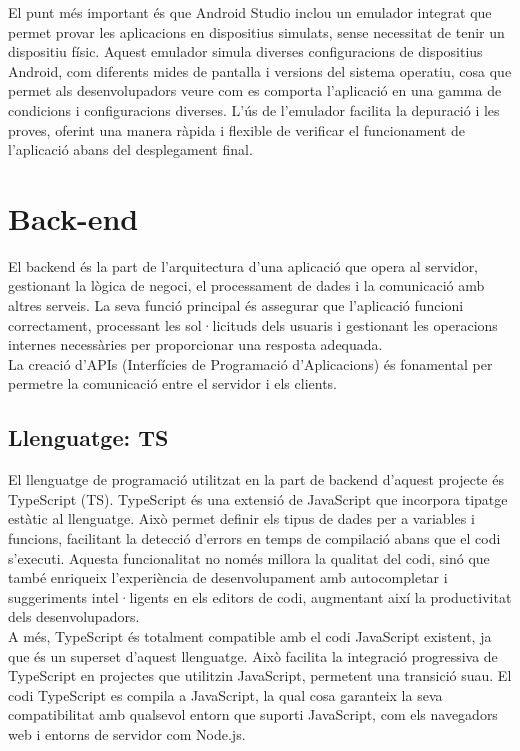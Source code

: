 \documentclass[a4paper,12pt,twoside]{ThesisStyle}
\begin{document}
El punt més important és que Android Studio inclou un emulador integrat que permet provar les aplicacions en dispositius simulats, sense necessitat de tenir un dispositiu físic. Aquest emulador simula diverses configuracions de dispositius Android, com diferents mides de pantalla i versions del sistema operatiu, cosa que permet als desenvolupadors veure com es comporta l’aplicació en una gamma de condicions i configuracions diverses. L'ús de l'emulador facilita la depuració i les proves, oferint una manera ràpida i flexible de verificar el funcionament de l’aplicació abans del desplegament final.



\section{Back-end}
\label{sec: Back-end}

El backend és la part de l'arquitectura d'una aplicació que opera al servidor, gestionant la lògica de negoci, el processament de dades i la comunicació amb altres serveis. La seva funció principal és assegurar que l'aplicació funcioni correctament, processant les sol·licituds dels usuaris i gestionant les operacions internes necessàries per proporcionar una resposta adequada.\\

La creació d'APIs (Interfícies de Programació d'Aplicacions) és fonamental per permetre la comunicació entre el servidor i els clients.

\subsection{Llenguatge: TS}
\label{subsec:Llenguatge: TS}

El llenguatge de programació utilitzat en la part de backend d'aquest projecte és TypeScript (TS). TypeScript és una extensió de JavaScript que incorpora tipatge estàtic al llenguatge. Això permet definir els tipus de dades per a variables i funcions, facilitant la detecció d'errors en temps de compilació abans que el codi s'executi. Aquesta funcionalitat no només millora la qualitat del codi, sinó que també enriqueix l'experiència de desenvolupament amb autocompletar i suggeriments intel·ligents en els editors de codi, augmentant així la productivitat dels desenvolupadors.\\

A més, TypeScript és totalment compatible amb el codi JavaScript existent, ja que és un superset d’aquest llenguatge. Això facilita la integració progressiva de TypeScript en projectes que utilitzin JavaScript, permetent una transició suau. El codi TypeScript es compila a JavaScript, la qual cosa garanteix la seva compatibilitat amb qualsevol entorn que suporti JavaScript, com els navegadors web i entorns de servidor com Node.js.
\end{document}

